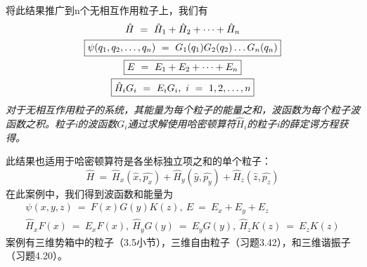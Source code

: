 \documentclass[12pt,a4paper,openany]{ctexbook}
\newcommand{\Ham}{\hat{H}}
\begin{document}
\begin{flushleft}
将此结果推广到n个无相互作用粒子上，我们有
\begin{gather}
    \Ham\ =\ \Ham_1+\Ham_2+\dots+\Ham_n \notag \\
    \boxed{\psi(q_1,q_2,\dots,q_n)\ =\ G_1(q_1)G_2(q_2)\dots G_n(q_n)} \label{eq6.25} \\
    \boxed{E\ =\ E_1+E_2+\dots+E_n} \label{eq6.26} \\
    \boxed{\Ham_iG_i\ =\ E_iG_i,\ i\ =\ 1,2,\dots,n} \label{eq6.27}
\end{gather}
\textit{对于无相互作用粒子的系统，其能量为每个粒子的能量之和，波函数为每个粒子波函数之积。粒子i的波函数$G_i$通过求解使用哈密顿算符$\Ham_i$的粒子i的薛定谔方程获得。}

此结果也适用于哈密顿算符是各坐标独立项之和的单个粒子：
\begin{equation*}
    \Ham\ =\ \Ham_x(\hat{x},\hat{p_x})+\Ham_y(\hat{y},\hat{p_y})+\Ham_z(\hat{z},\hat{p_z})
\end{equation*}
在此案例中，我们得到波函数和能量为
\begin{gather*}
    \psi(x,y,z)\ =\ F(x)G(y)K(z),\ E\ =\ E_x+E_y+E_z \\
    \Ham_xF(x)\ =\ E_xF(x),\ \Ham_yG(y)\ =\ E_yG(y),\ \Ham_zK(z)\ =\ E_zK(z)
\end{gather*}
案例有三维势箱中的粒子（3.5小节），三维自由粒子（习题3.42），和三维谐振子（习题4.20）。
\end{flushleft}
\end{document}
